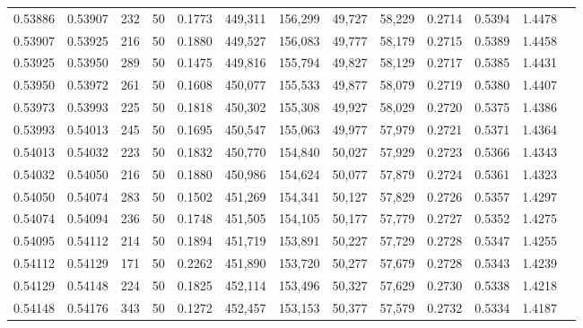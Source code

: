 \begin{tabular}{rrrrrrrrrrrrr}
0.53886 & 0.53907 &   232 &  50 &                                     0.1773 & 449,311 & 156,299 &  49,727 &  58,229 & 0.2714 & 0.5394 & 1.4478 \\
0.53907 & 0.53925 &   216 &  50 &                                     0.1880 & 449,527 & 156,083 &  49,777 &  58,179 & 0.2715 & 0.5389 & 1.4458 \\
0.53925 & 0.53950 &   289 &  50 &                                     0.1475 & 449,816 & 155,794 &  49,827 &  58,129 & 0.2717 & 0.5385 & 1.4431 \\
0.53950 & 0.53972 &   261 &  50 &                                     0.1608 & 450,077 & 155,533 &  49,877 &  58,079 & 0.2719 & 0.5380 & 1.4407 \\
0.53973 & 0.53993 &   225 &  50 &                                     0.1818 & 450,302 & 155,308 &  49,927 &  58,029 & 0.2720 & 0.5375 & 1.4386 \\
0.53993 & 0.54013 &   245 &  50 &                                     0.1695 & 450,547 & 155,063 &  49,977 &  57,979 & 0.2721 & 0.5371 & 1.4364 \\
0.54013 & 0.54032 &   223 &  50 &                                     0.1832 & 450,770 & 154,840 &  50,027 &  57,929 & 0.2723 & 0.5366 & 1.4343 \\
0.54032 & 0.54050 &   216 &  50 &                                     0.1880 & 450,986 & 154,624 &  50,077 &  57,879 & 0.2724 & 0.5361 & 1.4323 \\
0.54050 & 0.54074 &   283 &  50 &                                     0.1502 & 451,269 & 154,341 &  50,127 &  57,829 & 0.2726 & 0.5357 & 1.4297 \\
0.54074 & 0.54094 &   236 &  50 &                                     0.1748 & 451,505 & 154,105 &  50,177 &  57,779 & 0.2727 & 0.5352 & 1.4275 \\
0.54095 & 0.54112 &   214 &  50 &                                     0.1894 & 451,719 & 153,891 &  50,227 &  57,729 & 0.2728 & 0.5347 & 1.4255 \\
0.54112 & 0.54129 &   171 &  50 &                                     0.2262 & 451,890 & 153,720 &  50,277 &  57,679 & 0.2728 & 0.5343 & 1.4239 \\
0.54129 & 0.54148 &   224 &  50 &                                     0.1825 & 452,114 & 153,496 &  50,327 &  57,629 & 0.2730 & 0.5338 & 1.4218 \\
0.54148 & 0.54176 &   343 &  50 &                                     0.1272 & 452,457 & 153,153 &  50,377 &  57,579 & 0.2732 & 0.5334 & 1.4187 \\

\end{tabular}
